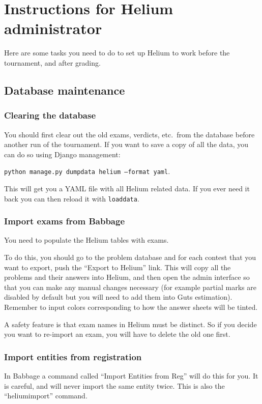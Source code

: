 \chapter{Instructions for Helium administrator}
Here are some tasks you need to do to set up Helium
to work before the tournament, and after grading.

\section{Database maintenance}
\subsection{Clearing the database}
You should first clear out the old exams, verdicts, etc.\ from the database
before another run of the tournament.
If you want to save a copy of all the data,
you can do so using Django management:
\begin{center}
	\texttt{python manage.py dumpdata helium --format yaml}.
\end{center}
This will get you a YAML file with all Helium related data.
If you ever need it back you can then reload it with \texttt{loaddata}.

\subsection{Import exams from Babbage}
You need to populate the Helium tables with exams.

To do this, you should go to the problem database and for each contest
that you want to export, push the ``Export to Helium'' link.
This will copy all the problems and their answers into Helium,
and then open the admin interface
so that you can make any manual changes necessary
(for example partial marks are disabled by default
but you will need to add them into Guts estimation).
Remember to input colors corresponding to how the answer sheets will be tinted.

A safety feature is that exam names in Helium must be distinct.
So if you decide you want to re-import an exam,
you will have to delete the old one first.

\subsection{Import entities from registration}
In Babbage a command called ``Import Entities from Reg'' will do this for you.
It is careful, and will never import the same entity twice.
This is also the ``heliumimport'' command.

